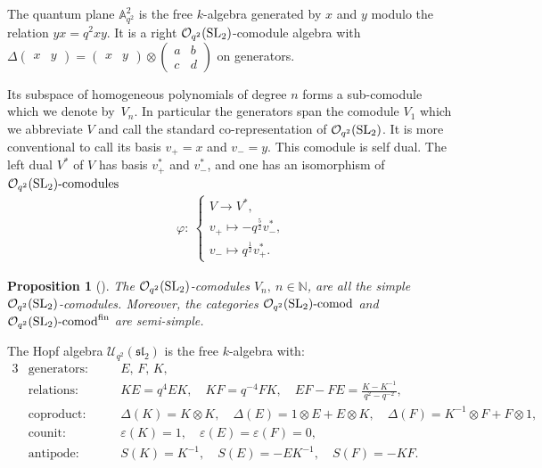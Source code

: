 \documentclass[pdftex]{sigma}%
\numberwithin{equation}{section}
\newtheorem{Proposition}[Theorem]{Proposition}
 { \theoremstyle{definition}
\newtheorem{Definition}[Theorem]{Definition}
\newtheorem{Note}[Theorem]{Note}
\newtheorem{Example}[Theorem]{Example}
\newtheorem{Remark}[Theorem]{Remark} }
\newcommand{\Oq}{\mathcal{O}_{q^2}({\rm SL}_2)}
\newcommand{\Uq}{\mathcal{U}_{q^2}(\mathfrak{sl}_2)}
\begin{document}
\begin{Definition}\label{defOqcomods}
The quantum plane $\mathbb{A}_{q^2}^2$ is the free $k$-algebra generated by $x$ and $y$ modulo the relation $yx = q^2xy$. It is a right $\Oq$-comodule algebra with $\Delta \left(\begin{smallmatrix} x&y \end{smallmatrix}\right) = \left(\begin{smallmatrix} x&y \end{smallmatrix}\right) \otimes \left( \begin{smallmatrix} a & b \\ c & d \end{smallmatrix}\right)$ on generators.

Its subspace of homogeneous polynomials of degree $n$ forms a sub-comodule which we denote by~$V_n$.
In particular the generators span the comodule $V_1$ which we abbreviate $V$ and call the standard co-representation of $\Oq$. It is more conventional to call its basis $v_+ = x$ and $v_- = y$. This comodule is self dual. The left dual $V^*$ of $V$ has basis $v_+^*$ and $v_-^*$, and one has an isomorphism of $\Oq\text{-comodules}$
\begin{gather*}
\varphi \colon \
\begin{cases}
V \to V^*,
\\
v_+ \mapsto -q^{\frac{5}{2}} v_-^*,
\\[.5ex]
v_- \mapsto q^{\frac{1}{2}}v_+^*.
\end{cases}
\end{gather*}
\end{Definition}

{\sloppy\begin{Proposition}[{\cite[Section~4.2.1]{Klimyk}}]\label{propOqSemiSimple}
The $\Oq$-comodules $V_n,\ n \in \mathbb{N}$, are all the simple $\Oq$-comodules. Moreover, the categories $\Oq\text{-}{\rm comod}$ and $\Oq\text{-}{\rm comod}^{\rm fin}$ are semi-simple.
\end{Proposition}}

\begin{Definition}
The Hopf algebra $\Uq$ is the free $k$-algebra with:
\begin{alignat*}{3}
& \text{generators}\colon\quad  &&E,\,F,\,K,&
\\
&\text{relations}\colon && KE=q^4EK, \quad KF=q^{-4}FK,\quad  EF-FE = \frac{K-K^{-1}}{q^2-q^{-2}},&
\\
&\text{coproduct}\colon &&\Delta (K) = K \otimes K,\quad \Delta (E) = 1\otimes E+E\otimes K,\quad \Delta (F) = K^{-1}\otimes F + F\otimes 1,&
\\
& \text{counit}\colon && \varepsilon(K)=1,\quad\varepsilon(E)=\varepsilon(F)=0,&
\\
& \text{antipode}\colon && S(K) = K^{-1},\quad S(E) = -EK^{-1},\quad S(F) =-KF.&
\end{alignat*}
\end{Definition}
\end{document}
